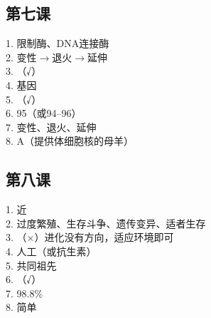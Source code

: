 \documentclass[a4paper,12pt]{ctexart}
\begin{document}
\subsection*{第七课}
1. 限制酶、DNA连接酶\\
2. 变性$\rightarrow$退火$\rightarrow$延伸\\
3. （√）\\
4. 基因\\
5. （√）\\
6. 95（或94--96）\\
7. 变性、退火、延伸\\
8. A（提供体细胞核的母羊）

\subsection*{第八课}
1. 近\\
2. 过度繁殖、生存斗争、遗传变异、适者生存\\
3. （×）进化没有方向，适应环境即可\\
4. 人工（或抗生素）\\
5. 共同祖先\\
6. （√）\\
7. 98.8\%\\
8. 简单
\end{document}
